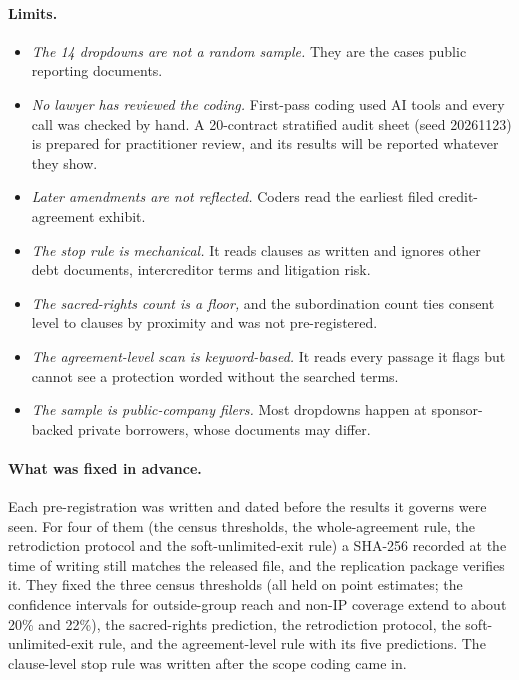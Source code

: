 \documentclass[12pt]{article}
\begin{document}
\paragraph{Limits.}
\begin{itemize}
\item \emph{The 14 dropdowns are not a random sample.} They are the cases public reporting documents.
\item \emph{No lawyer has reviewed the coding.} First-pass coding used AI tools and every call was checked by hand. A 20-contract stratified audit sheet (seed 20261123) is prepared for practitioner review, and its results will be reported whatever they show.
\item \emph{Later amendments are not reflected.} Coders read the earliest filed credit-agreement exhibit.
\item \emph{The stop rule is mechanical.} It reads clauses as written and ignores other debt documents, intercreditor terms and litigation risk.
\item \emph{The sacred-rights count is a floor,} and the subordination count ties consent level to clauses by proximity and was not pre-registered.
\item \emph{The agreement-level scan is keyword-based.} It reads every passage it flags but cannot see a protection worded without the searched terms.
\item \emph{The sample is public-company filers.} Most dropdowns happen at sponsor-backed private borrowers, whose documents may differ.
\end{itemize}

\paragraph{What was fixed in advance.} Each pre-registration was written and dated before the results it governs were seen. For four of them (the census thresholds, the whole-agreement rule, the retrodiction protocol and the soft-unlimited-exit rule) a SHA-256 recorded at the time of writing still matches the released file, and the replication package verifies it. They fixed the three census thresholds (all held on point estimates; the confidence intervals for outside-group reach and non-IP coverage extend to about 20\% and 22\%), the sacred-rights prediction, the retrodiction protocol, the soft-unlimited-exit rule, and the agreement-level rule with its five predictions. The clause-level stop rule was written after the scope coding came in.
\end{document}
